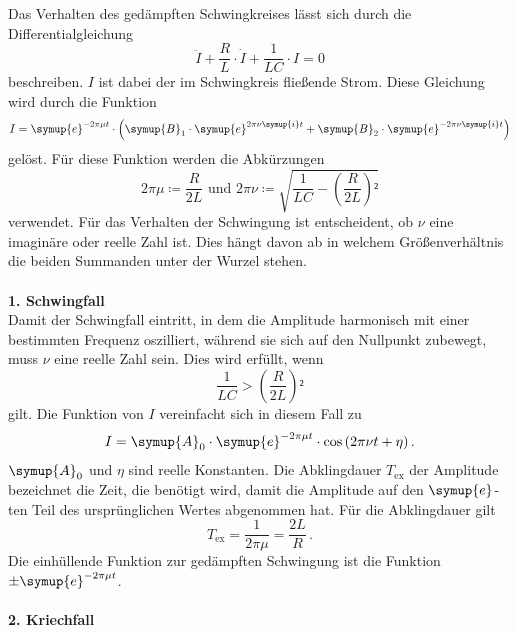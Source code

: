 Das Verhalten des gedämpften Schwingkreises lässt sich durch die Differentialgleichung 
\begin{equation}
    \ddot{I} + \frac{R}{L} \cdot \dot{I} + \frac{1}{L C} \cdot I = 0 
\end{equation}
beschreiben. $I$ ist dabei der im Schwingkreis fließende Strom. 
Diese Gleichung wird durch die Funktion  
\begin{equation}
    I = \symup{e}^{-2\pi\mu t} \cdot \left(\symup{B}_1 \cdot \symup{e}^{2\pi\nu \symup{i}t}  + \symup{B}_2 \cdot \symup{e}^{- 2\pi\nu \symup{i}t} \right)
\end{equation}
gelöst. Für diese Funktion werden die Abkürzungen 
\begin{equation*}
2 \pi \mu \coloneqq \frac{R}{2 L}  \,\,\text{und}\,\, 2 \pi \nu \coloneqq \sqrt{\frac{1}{LC} - \left(\frac{R}{2L}\right)²}
\end{equation*}
verwendet. Für das Verhalten der Schwingung ist entscheident, ob $\nu$ eine imaginäre
oder reelle Zahl ist. Dies hängt davon ab in welchem Größenverhältnis die beiden 
Summanden unter der Wurzel stehen. \\
\\
\textbf{1. Schwingfall}\\
Damit der Schwingfall eintritt, in dem die Amplitude harmonisch mit einer bestimmten Frequenz 
oszilliert, während sie sich auf den 
Nullpunkt zubewegt, muss $\nu$ eine reelle Zahl sein. Dies wird erfüllt, wenn 
\begin{equation*}
    \frac{1}{LC} > \left(\frac{R}{2L}\right)² 
\end{equation*}
gilt. Die Funktion von $I$ vereinfacht sich in diesem Fall zu
\begin{equation}
    I = \symup{A}_0 \cdot \symup{e}^{-2\pi\mu t} \cdot \cos{ \left(2\pi\nu t + \eta\right)} \, .
\end{equation}
$\symup{A}_0$ und $\eta$ sind reelle Konstanten. Die Abklingdauer $T_{\text{ex}}$ der Amplitude bezeichnet
die Zeit, die benötigt wird, damit die Amplitude auf den $\symup{e}$-ten Teil des 
ursprünglichen Wertes abgenommen hat. Für die Abklingdauer gilt
\begin{equation}
    T_{\text{ex}} = \frac{1}{2\pi\mu} = \frac{2 L}{R} \, .
\end{equation}
Die einhüllende Funktion zur gedämpften Schwingung ist die Funktion $\pm \symup{e}^{-2\pi\mu t}$. \\
\\
\textbf{2. Kriechfall}\\
